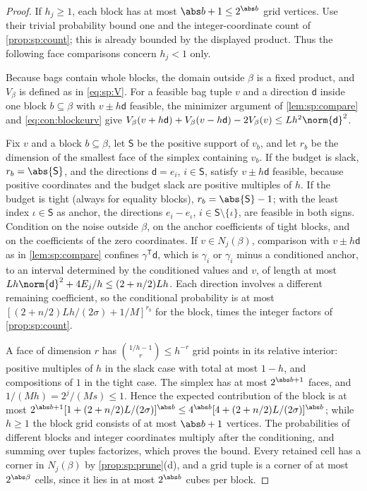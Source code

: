 \begin{proof}
If $h_j\ge1$, each block has at most $\abs b+1\le2^{\abs b}$ grid vertices.
Use their trivial probability bound one and the integer-coordinate count
of \cref{prop:sp:count}; this is already bounded by the displayed product.
Thus the following face comparisons concern $h_j<1$ only.

Because bags contain whole blocks, the domain outside $\beta$ is a fixed
product, and $V_\beta$ is defined as in \eqref{eq:sp:V}. For a feasible bag
tuple $v$ and a direction $\mathsf d$ inside one block $b\subseteq\beta$ with
$v\pm h\mathsf d$ feasible, the minimizer argument of \cref{lem:sp:compare}
and \eqref{eq:con:blockcurv} give
$V_\beta(v+h\mathsf d)+V_\beta(v-h\mathsf d)-2V_\beta(v)\le Lh^2\norm{\mathsf d}^2$.

Fix $v$ and a block $b\subseteq\beta$, let $\mathsf S$ be the positive support
of $v_b$, and let $r_b$ be the dimension of the smallest face of the
simplex containing $v_b$. If the budget is slack, $r_b=\abs{\mathsf S}$, and
the directions $\mathsf d=e_i$, $i\in\mathsf S$, satisfy $v\pm h\mathsf d$
feasible, because positive coordinates and the budget slack are positive
multiples of $h$. If the budget is tight (always for equality blocks),
$r_b=\abs{\mathsf S}-1$; with the least index $\iota\in\mathsf S$ as anchor, the
directions $e_i-e_\iota$, $i\in\mathsf S\setminus\{\iota\}$, are feasible in
both signs. Condition on the noise outside $\beta$, on the anchor
coefficients of tight blocks, and on the coefficients of the zero coordinates.
If $v\in N_j(\beta)$, comparison with $v\pm h\mathsf d$ as in
\cref{lem:sp:compare} confines $\gamma^{\mathsf T}\mathsf d$, which is $\gamma_i$
or $\gamma_i$ minus a conditioned anchor, to an interval determined by the
conditioned values and $v$, of length at most
$Lh\norm{\mathsf d}^2+4E_j/h\le(2+n/2)Lh$. Each direction involves a different
remaining coefficient, so the conditional probability is at most
$[(2+n/2)Lh/(2\sigma)+1/M]^{r_b}$ for the block, times the integer factors of
\cref{prop:sp:count}.

A face of dimension $r$ has $\binom{1/h-1}{r}\le h^{-r}$ grid points in its
relative interior: positive multiples of $h$ in the slack case with total at
most $1-h$, and compositions of $1$ in the tight case. The simplex has at most
$2^{\abs b+1}$ faces, and $1/(Mh)=2^j/(Ms)\le1$. Hence the expected
contribution of the block is at most
$2^{\abs b+1}[1+(2+n/2)L/(2\sigma)]^{\abs b}\le4^{\abs b}[4+(2+n/2)L/(2\sigma)]^{\abs b}$;
while $h\ge1$ the block grid consists of at most $\abs b+1$ vertices. The
probabilities of different blocks and integer coordinates multiply after the
conditioning, and summing over tuples factorizes, which proves the bound.
Every retained cell has a corner in $N_j(\beta)$ by \cref{prop:sp:prune}(d),
and a grid tuple is a corner of at most $2^{\abs\beta}$ cells, since it lies in
at most $2^{\abs b}$ cubes per block.
\end{proof}

